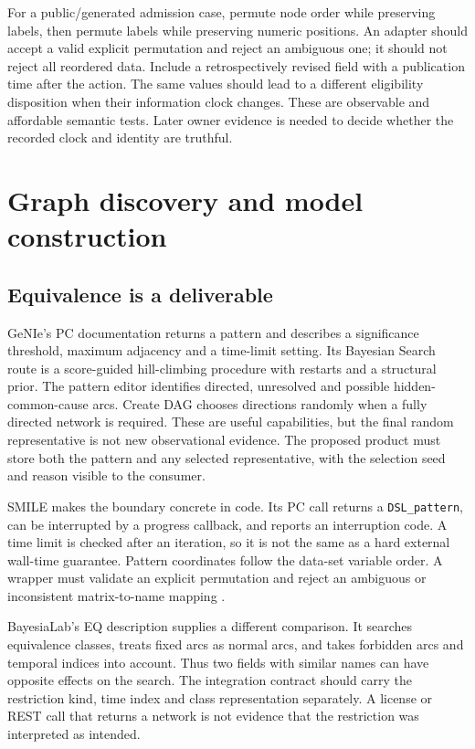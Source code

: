 For a public/generated admission case, permute node order while preserving
labels, then permute labels while preserving numeric positions. An adapter
should accept a valid explicit permutation and reject an ambiguous one; it
should not reject all reordered data. Include a retrospectively revised field
with a publication time after the action. The same values should lead to a
different eligibility disposition when their information clock changes.
These are observable and affordable semantic tests. Later owner evidence is
needed to decide whether the recorded clock and identity are truthful.

\section{Graph discovery and model construction}
\label{exec17:s8-discovery}

\subsection{Equivalence is a deliverable}

GeNIe's PC documentation returns a pattern and describes a significance
threshold, maximum adjacency and a time-limit setting. Its Bayesian Search
route is a score-guided hill-climbing procedure with restarts and a structural
prior. The pattern editor identifies directed, unresolved and possible
hidden-common-cause arcs. Create DAG chooses directions randomly when a fully
directed network is required. These are useful capabilities, but the final
random representative is not new observational evidence. The proposed product
must store both the pattern and any selected representative, with the selection
seed and reason visible to the consumer.

SMILE makes the boundary concrete in code. Its PC call returns a
\texttt{DSL\_pattern}, can be interrupted by a progress callback, and reports
an interruption code. A time limit is checked after an iteration, so it is not
the same as a hard external wall-time guarantee. Pattern coordinates follow
the data-set variable order. A wrapper must validate an explicit permutation
and reject an ambiguous or inconsistent matrix-to-name mapping
\citep{exec13_smile_pc,exec13_smile_pattern}.

BayesiaLab's EQ description supplies a different comparison. It searches
equivalence classes, treats fixed arcs as normal arcs, and takes forbidden arcs
and temporal indices into account. Thus two fields with similar names can have
opposite effects on the search. The integration contract should carry the
restriction kind, time index and class representation separately. A license or
REST call that returns a network is not evidence that the restriction was
interpreted as intended.

